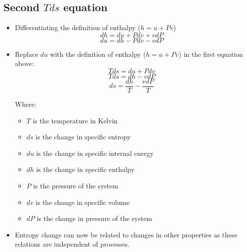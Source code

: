 \documentclass[11pt]{article}
\begin{document}
\subsection{Second \(T ds\) equation}
\label{sec:org9b75dc9}
\begin{itemize}
\item Differentiating the definition of enthalpy (\(h = u + Pv\))
\[dh = du + P dv + vdP\]
\[du = dh - P dv - vdP\]

\item Replace \(du\) with the definition of enthalpy (\(h = u + Pv\)) in the first equation above:
\[Tds = du + P dv\]
\[Tds = dh - v dP\]
\[ds = \frac{dh}{T} - \frac{v dP}{T}\]

Where:
\begin{itemize}
\item \(T\) is the temperature in Kelvin
\item \(ds\) is the change in specific entropy
\item \(du\) is the change in specific internal energy
\item \(dh\) is the change in specific enthalpy
\item \(P\) is the pressure of the system
\item \(dv\) is the change in specific volume
\item \(dP\) is the change in pressure of the system
\end{itemize}

\item Entropy change can now be related to changes in other properties as these relations are independent of processes.
\end{itemize}

 \newpage
\end{document}

